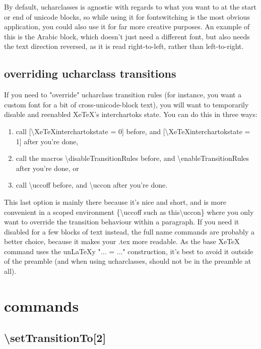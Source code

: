 \documentclass{article}
\newenvironment{numberlist}{%
  \begin{enumerate}
	\setlength{\itemsep}{0pt}
	\setlength{\parsep}{0pt}
	\setlength{\topsep}{0pt}
	\setlength{\partopsep}{0pt}
	\setlength{\parskip}{0pt}
	\setlength{\labelsep}{5pt}}%
{
  \end{enumerate}}
\begin{document}
		By default, ucharclasses is agnostic with regards to what you want to at the start or end of unicode blocks, so while using it for fontswitching is the most obvious application, you could also use it for far more creative purposes. An example of this is the Arabic block, which doesn't just need a different font, but also needs the text direction reversed, as it is read right-to-left, rather than left-to-right.

		\subsection{overriding ucharclass transitions}
		
			If you need to "override" ucharclass transition rules (for instance, you want a custom font for a bit of cross-unicode-block text), you will want to temporarily disable and reenabled XeTeX's interchartoks state. You can do this in three ways:
			
			\begin{numberlist}
				\item call [\textbackslash XeTeXinterchartokstate = 0] before, and [\textbackslash XeTeXinterchartokstate = 1] after you're done,
				\item call the macros \textbackslash disableTransitionRules before, and \textbackslash enableTransitionRules after you're done, or
				\item call \textbackslash uccoff before, and \textbackslash uccon after you're done.
			\end{numberlist}
			
			This last option is mainly there because it's nice and short, and is more convenient in a scoped environment \{\textbackslash uccoff such as this\textbackslash uccon\} where you only want to override the transition behaviour within a paragraph. If you need it disabled for a few blocks of text instead, the full name commands are probably a better choice, because it makes your .tex more readable. As the base XeTeX command uses the un\LaTeX y "... = ..." construction, it's best to avoid it outside of the preamble (and when using ucharclasses, should not be in the preamble at all).

	\section{commands}
		
		\subsection{\textbackslash setTransitionTo[2]}
\end{document}
